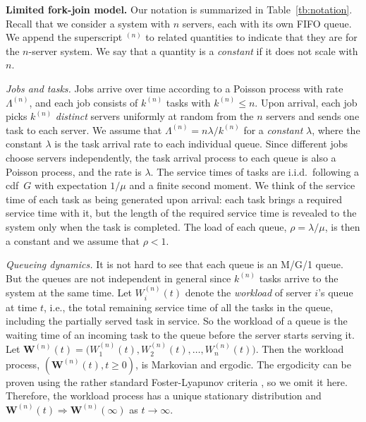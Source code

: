 \documentclass[sigconf]{acmart}
\newcommand{\cdf}{cdf}
\newcommand{\supn}{^{(n)}}
\newcommand{\tod}{\Rightarrow}
\begin{document}
\textbf{Limited fork-join model.}
Our notation is summarized in Table~\ref{tb:notation}.  Recall that we consider a system with $n$ servers, each with its own FIFO queue.  We append the superscript $\supn$ to related quantities to indicate that they are for the $n$-server system. We say that a quantity is a \emph{constant} if it does not scale with $n$.

\emph{Jobs and tasks.}
Jobs arrive over time according to a Poisson process with rate $\Lambda\supn$, and each job consists of $k\supn$ tasks with $k\supn\le n$.  Upon arrival, each job picks $k\supn$ \emph{distinct} servers uniformly at random from the $n$ servers and sends one task to each server. We assume that $\Lambda\supn=n\lambda/k\supn$ for a \emph{constant} $\lambda$, where the constant $\lambda$ is the task arrival rate to each individual queue. Since different jobs choose servers independently, the task arrival process to each queue is also a Poisson process, and the rate is $\lambda$. The service times of tasks are i.i.d.\ following a \cdf\ $G$ with expectation $1/\mu$ and a finite second moment. We think of the service time of each task as being generated upon arrival: each task brings a required service time with it, but the length of the required service time is revealed to the system only when the task is completed.  The load of each queue, $\rho=\lambda/\mu$, is then a constant and we assume that $\rho<1$.

\emph{Queueing dynamics.}
It is not hard to see that each queue is an M/G/1 queue.  But the queues are not independent in general since $k\supn$ tasks arrive to the system at the same time.
Let $W\supn_i(t)$ denote the \emph{workload} of server $i$'s queue at time $t$, i.e., the total remaining service time of all the tasks in the queue, including the partially served task in service.  So the workload of a queue is the waiting time of an incoming task to the queue before the server starts serving it.  Let $\bm{W}\supn(t)=\bigl(W\supn_1(t),W\supn_2(t),\dots,W\supn_n(t)\bigr)$.  Then the workload process, $(\bm{W}\supn(t),t\ge 0)$, is Markovian and ergodic.  The ergodicity can be proven using the rather standard Foster-Lyapunov criteria \cite{MeyTwe_93}, so we omit it here. Therefore, the workload process has a unique stationary distribution and $\bm{W}\supn(t)\tod \bm{W}\supn(\infty)$ as $t\to\infty$.
\end{document}
